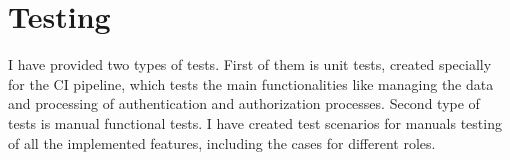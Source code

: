 \chapter{Testing} I have provided two types of tests. First of them is unit tests, created specially for the CI pipeline, which tests the main functionalities like managing the data and processing of authentication and  authorization processes. Second type of tests is manual functional tests. I have created test scenarios for manuals testing of all the implemented features, including the cases for different roles.







